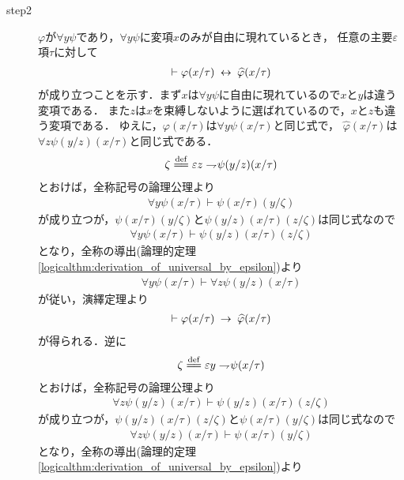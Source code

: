 \begin{sketch}
\begin{description}
			\item[step2]
				$\varphi$が$\forall y \psi$であり，$\forall y \psi$に変項$x$のみが自由に現れているとき，
				任意の主要$\varepsilon$項$\tau$に対して
				\begin{align}
					\vdash \varphi(x/\tau) \hspace{0.25em}\leftrightarrow\hspace{0.25em} \widehat{\varphi}(x/\tau)
				\end{align}
				が成り立つことを示す．まず$x$は$\forall y \psi$に自由に現れているので$x$と$y$は違う変項である．
				また$z$は$x$を束縛しないように選ばれているので，$x$と$z$も違う変項である．
				ゆえに，$\varphi(x/\tau)$は$\forall y \psi(x/\tau)$と同じ式で，
				$\widehat{\varphi}(x/\tau)$は$\forall z \psi(y/z)(x/\tau)$と同じ式である．
				\begin{align}
					\zeta \defeq \varepsilon z \negation \psi(y/z)(x/\tau)
				\end{align}
				とおけば，全称記号の論理公理より
				\begin{align}
					\forall y \psi(x/\tau) \vdash \psi(x/\tau)(y/\zeta)
				\end{align}
				が成り立つが，$\psi(x/\tau)(y/\zeta)$と$\psi(y/z)(x/\tau)(z/\zeta)$は同じ式なので
				\begin{align}
					\forall y \psi(x/\tau) \vdash \psi(y/z)(x/\tau)(z/\zeta)
				\end{align}
				となり，全称の導出(論理的定理\ref{logicalthm:derivation_of_universal_by_epsilon})より
				\begin{align}
					\forall y \psi(x/\tau) \vdash \forall z \psi(y/z)(x/\tau)
				\end{align}
				が従い，演繹定理より
				\begin{align}
					\vdash \varphi(x/\tau) \hspace{0.25em}\rightarrow\hspace{0.25em} \widehat{\varphi}(x/\tau)
					\label{fom:equivalence_by_replacing_bound_variables_3}
				\end{align}
				が得られる．逆に
				\begin{align}
					\zeta \defeq \varepsilon y \negation \psi(x/\tau)
				\end{align}
				とおけば，全称記号の論理公理より
				\begin{align}
					\forall z \psi(y/z)(x/\tau) \vdash \psi(y/z)(x/\tau)(z/\zeta)
				\end{align}
				が成り立つが，$\psi(y/z)(x/\tau)(z/\zeta)$と$\psi(x/\tau)(y/\zeta)$は同じ式なので
				\begin{align}
					\forall z \psi(y/z)(x/\tau) \vdash \psi(x/\tau)(y/\zeta)
				\end{align}
				となり，全称の導出(論理的定理\ref{logicalthm:derivation_of_universal_by_epsilon})より

\end{description}
\end{sketch}
